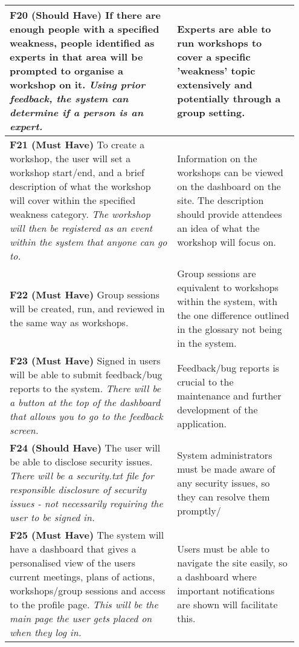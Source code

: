 \documentclass[10pt]{article}
\begin{document}
\begin{longtable}{|p{0.55\linewidth}|p{0.4\linewidth}|}
    \textbf{F20 (Should Have) }
    If there are enough people with a specified weakness, people identified as
    experts in that area will be prompted to organise a workshop on it.
    \textit{Using prior feedback, the system can determine if a person is an
    expert.}
        &
    Experts are able to run workshops to cover a specific 'weakness' topic
    extensively and potentially through a group setting.
    \\ \hline

    \textbf{F21 (Must Have) }
    To create a workshop, the user will set a workshop start/end, and a brief
    description of what the workshop will cover within the specified weakness
    category.
    \textit{The workshop will then be registered as an event within the system
    that anyone can go to.}
        &
    Information on the workshops can be viewed on the dashboard on the site. The
    description should provide attendees an idea of what the workshop will focus
    on.
    \\ \hline

    \textbf{F22 (Must Have) }
    Group sessions will be created, run, and reviewed in the same way as
    workshops.
        &
    Group sessions are equivalent to workshops within the system, with the one
    difference outlined in the glossary not being in the system.
    \\ \hline

    \textbf{F23 (Must Have) }
    Signed in users will be able to submit feedback/bug reports to the system.
    \textit{There will be a button at the top of the dashboard that allows you
    to go to the feedback screen.}
        &
    Feedback/bug reports is crucial to the maintenance and further development
    of the application.
    \\ \hline

    \textbf{F24 (Should Have) }
    The user will be able to disclose security issues.
    \textit{There will be a security.txt file for responsible disclosure of
    security issues - not necessarily requiring the user to be signed in.}
        &
    System administrators must be made aware of any security issues, so they can
    resolve them promptly/
    \\ \hline

    \textbf{F25 (Must Have) }
    The system will have a dashboard that gives a personalised view of the users
    current meetings, plans of actions, workshops/group sessions and access to
    the profile page.
    \textit{This will be the main page the user gets placed on when they log in.}
        &
    Users must be able to navigate the site easily, so a dashboard where
    important notifications are shown will facilitate this.
    \\ \hline


\end{longtable}
\end{document}
